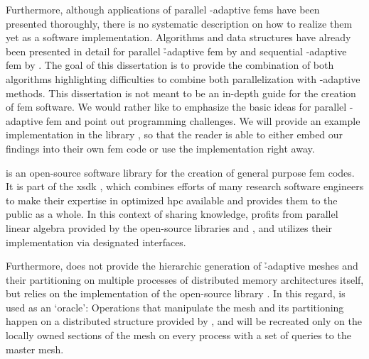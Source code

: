 Furthermore, although applications of parallel \hp-adaptive \glspl{fem} have been presented thoroughly, there is no systematic description on how to realize them yet as a software implementation.
Algorithms and data structures have already been presented in detail for parallel \h-adaptive \gls{fem} by \textcite{bangerth2012} and sequential \hp-adaptive \gls{fem} by \textcite{bangerth2009}.
The goal of this dissertation is to provide the combination of both algorithms highlighting difficulties to combine both parallelization with \hp-adaptive methods. This dissertation is not meant to be an in-depth guide for the creation of \gls{fem} software. We would rather like to emphasize the basic ideas for parallel \hp-adaptive \gls{fem} and point out programming challenges. We will provide an example implementation in the \dealii{} library \parencite{bangerth2007, dealii920pre}, so that the reader is able to either embed our findings into their own \gls{fem} code or use the \dealii{} implementation right away.

\dealii{} is an open-source software library for the creation of general purpose \gls{fem} codes.
It is part of the \gls{xsdk} \parencite{bartlett2017,xsdk050},
which combines efforts of many research software engineers to make their expertise in optimized \gls{hpc} available and provides them to the public as a whole.
In this context of sharing knowledge, \dealii{} profits from parallel linear algebra provided by the open-source libraries \trilinos{} \parencite{heroux2005,trilinos12181} and \petsc{} \parencite{balay2019,petsc3124}, and utilizes their implementation via designated interfaces.

Furthermore, \dealii{} does not provide the hierarchic generation of \h-adaptive meshes and their partitioning on multiple processes of distributed memory architectures itself, but relies on the implementation of the open-source library \pforest{} \parencite{burstedde2011,p4est22}. In this regard, \pforest{} is used as an `oracle': Operations that manipulate the mesh and its partitioning happen on a distributed structure provided by \pforest{}, and will be recreated only on the locally owned sections of the \dealii{} mesh
on every process with a set of queries to the master mesh.

